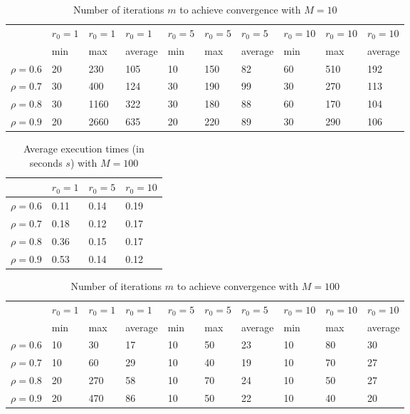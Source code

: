 \documentclass[a4paper,11pt,openright]{report}
\begin{document}
\begin{table}[H]
\centering
\addtolength{\leftskip}{-1.5cm}
\addtolength{\rightskip}{-1.5cm}
\begin{tabular}{|c|lllllllll|}
\hline
$ $ & $r_0 = 1$ & $r_0 = 1$ & $r_0 = 1$ & $r_0 = 5$ & $r_0 = 5$ & $r_0 = 5$ & $r_0 = 10$ & $r_0 = 10$ & $r_0 = 10$  \\
$ $ & min & max & average & min & max & average & min & max & average \\ 
\hline
$\rho = 0.6$ & 20 & 230 & 105 & 10 & 150 & 82 & 60 & 510 & 192\\

$\rho = 0.7$ & 30 & 400 & 124 & 30 & 190 & 99 & 30 & 270 & 113\\

$\rho = 0.8$ & 30 & 1160 & 322 & 30 & 180 & 88 & 60 & 170 & 104\\

$\rho = 0.9$ & 20 & 2660 & 635 & 20 & 220 & 89 & 30 & 290 & 106\\
\hline
\end{tabular}
\caption{Number of iterations $m$ to achieve convergence with $M = 10$}
\end{table}
\begin{table}[H]
\centering
\addtolength{\leftskip}{-1.5cm}
\addtolength{\rightskip}{-1.5cm}
\begin{tabular}{|c|lll|}
\hline
$ $ & $r_0 = 1$ & $r_0 = 5$ & $r_0 = 10$ \\
\hline
$\rho = 0.6$ & 0.11 & 0.14 & 0.19 \\

$\rho = 0.7$ & 0.18 & 0.12 & 0.17 \\

$\rho = 0.8$ & 0.36 & 0.15 & 0.17 \\

$\rho = 0.9$ & 0.53 & 0.14 & 0.12 \\
\hline
\end{tabular}
\caption{Average execution
 times (in seconds $s$) with $M = 100$}
\end{table}
\begin{table}[H]
\centering
\addtolength{\leftskip}{-1.5cm}
\addtolength{\rightskip}{-1.5cm}
\begin{tabular}{|c|lllllllll|}
\hline
$ $ & $r_0 = 1$ & $r_0 = 1$ & $r_0 = 1$ & $r_0 = 5$ & $r_0 = 5$ & $r_0 = 5$ & $r_0 = 10$ & $r_0 = 10$ & $r_0 = 10$  \\
$ $ & min & max & average & min & max & average & min & max & average \\ 
\hline
$\rho = 0.6$ & 10 & 30 & 17 & 10 & 50 & 23 & 10 & 80 & 30\\

$\rho = 0.7$ & 10 & 60 & 29 & 10 & 40 & 19 & 10 & 70 & 27\\

$\rho = 0.8$ & 20 & 270 & 58 & 10 & 70 & 24 & 10 & 50 & 27\\

$\rho = 0.9$ & 20 & 470 & 86 & 10 & 50 & 22 & 10 & 40 & 20\\
\hline
\end{tabular}
\caption{Number of iterations $m$ to achieve convergence with $M = 100$}
\end{table}
\end{document}
